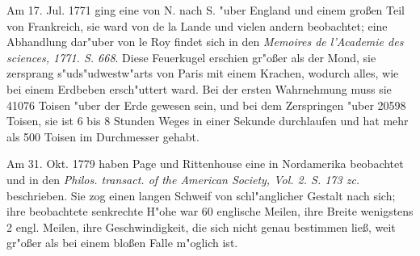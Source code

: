 \documentclass[a4paper, 11pt, oneside, polutonikogreek, german]{article}
\begin{document}
Am 17. Jul. 1771 ging eine von N. nach S. "uber England und einem großen Teil von Frankreich, sie ward von de la Lande und vielen andern beobachtet; eine Abhandlung dar"uber von le Roy findet sich in den \emph{Memoires de l'Academie des sciences, 1771. S. 668}. Diese Feuerkugel erschien gr"oßer als der Mond, sie zersprang s"uds"udwestw"arts von Paris mit einem Krachen, wodurch alles, wie bei einem Erdbeben ersch"uttert ward. Bei der ersten Wahrnehmung muss sie 41076 Toisen "uber der Erde gewesen sein, und bei dem Zerspringen "uber 20598 Toisen, sie ist 6 bis 8 Stunden Weges in einer Sekunde durchlaufen und hat mehr als 500 Toisen im Durchmesser gehabt.

Am 31. Okt. 1779 haben Page und Rittenhouse eine in Nordamerika beobachtet und in den \emph{Philos. transact. of the American Society, Vol. 2. S. 173 zc.} beschrieben. Sie zog einen langen Schweif von schl"anglicher Gestalt nach sich; ihre beobachtete senkrechte H"ohe war 60 englische Meilen, ihre Breite wenigstens 2 engl. Meilen, ihre Geschwindigkeit, die sich nicht genau bestimmen ließ, weit gr"oßer als bei einem bloßen Falle m"oglich ist.
\end{document}
